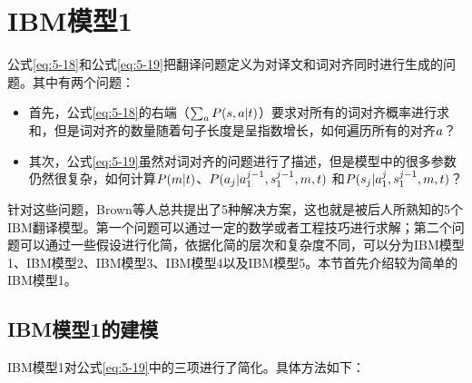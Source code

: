 
\sectionnewpage
\section{IBM模型1}\label{IBM-model1}
\parinterval 公式\eqref{eq:5-18}和公式\eqref{eq:5-19}把翻译问题定义为对译文和词对齐同时进行生成的问题。其中有两个问题：

\begin{itemize}
\vspace{0.3em}
\item 首先，公式\eqref{eq:5-18}的右端（$ \sum_{{a}}{P}({s},{a}|{t})$）要求对所有的词对齐概率进行求和，但是词对齐的数量随着句子长度是呈指数增长，如何遍历所有的对齐${a}$？
\vspace{0.3em}
\item 其次，公式\eqref{eq:5-19}虽然对词对齐的问题进行了描述，但是模型中的很多参数仍然很复杂，如何计算${P}(m|{t})$、${P}(a_j|a_1^{j-1},s_1^{j-1},m,{t})$ 和${P}(s_j|a_1^{j},s_1^{j-1},m,{t})$？
\vspace{0.3em}
\end{itemize}

针对这些问题，Brown等人总共提出了5种解决方案，这也就是被后人所熟知的5个IBM翻译模型。第一个问题可以通过一定的数学或者工程技巧进行求解；第二个问题可以通过一些假设进行化简，依据化简的层次和复杂度不同，可以分为IBM模型1、IBM模型2、IBM模型3、IBM模型4以及IBM模型5。本节首先介绍较为简单的IBM模型1。

\vspace{-0.5em}
\subsection{IBM模型1的建模}
\parinterval IBM模型1对公式\eqref{eq:5-19}中的三项进行了简化。具体方法如下：

